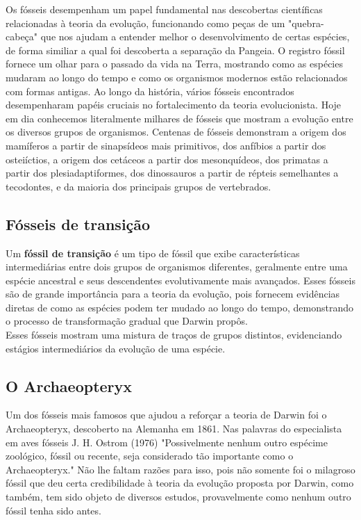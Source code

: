 \documentclass{report}
\begin{document}
Os fósseis desempenham um papel fundamental nas descobertas científicas relacionadas à teoria da evolução, funcionando como peças de um "quebra-cabeça" que nos ajudam a entender melhor o desenvolvimento de certas espécies, de forma similiar a qual foi descoberta a separação da Pangeia. O registro fóssil fornece um olhar para o passado da vida na Terra, mostrando como as espécies mudaram ao longo do tempo e como os organismos modernos estão relacionados com formas antigas. Ao longo da história, vários fósseis encontrados desempenharam papéis cruciais no fortalecimento da teoria evolucionista. Hoje em dia conhecemos literalmente milhares de fósseis que mostram a evolução entre os diversos grupos de organismos. Centenas de fósseis demonstram a origem dos mamíferos a partir de sinapsídeos mais primitivos, dos anfíbios a partir dos osteiíctios, a origem dos cetáceos a partir dos mesonquídeos, dos primatas a partir
dos plesiadaptiformes, dos dinossauros a partir de répteis semelhantes a
tecodontes, e da maioria dos principais grupos de vertebrados.

\subsection{Fósseis de transição}\label{subsec.fosseis3.1}

Um \textbf{fóssil de transição} é um tipo de fóssil que exibe características intermediárias entre dois grupos de organismos diferentes, geralmente entre uma espécie ancestral e seus descendentes evolutivamente mais avançados. Esses fósseis são de grande importância para a teoria da evolução, pois fornecem evidências diretas de como as espécies podem ter mudado ao longo do tempo, demonstrando o processo de transformação gradual que Darwin propôs. \\

Esses fósseis mostram uma mistura de traços de grupos distintos, evidenciando estágios intermediários da evolução de uma espécie.

\subsection{O Archaeopteryx}\label{subsec.fosseis3.2}

Um dos fósseis mais famosos que ajudou a reforçar a teoria de Darwin foi o Archaeopteryx, descoberto na Alemanha em 1861. Nas palavras do especialista em aves fósseis J. H. Ostrom (1976) "Possivelmente nenhum outro espécime zoológico, fóssil ou recente, seja considerado tão importante como o Archaeopteryx." Não lhe faltam razões para isso, pois não somente foi o milagroso fóssil que deu certa credibilidade à teoria da evolução proposta por Darwin, como também, tem sido objeto de diversos estudos, provavelmente como nenhum outro fóssil tenha sido antes. 
\end{document}
